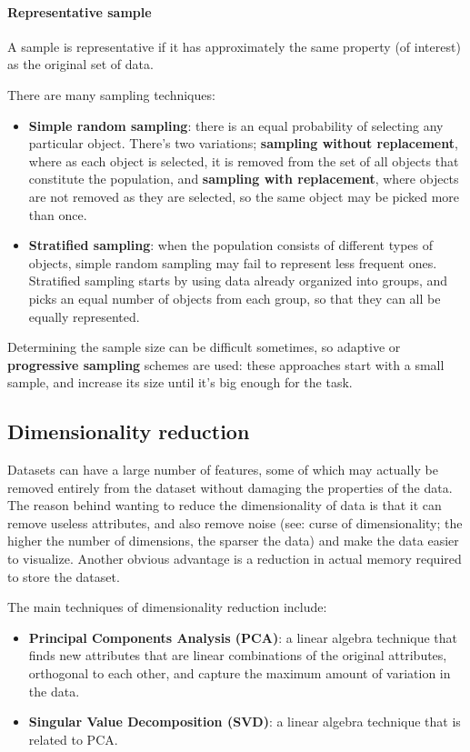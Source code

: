 \paragraph{Representative sample} A sample is representative if it has approximately the same property (of interest) as the original set of data.

There are many sampling techniques:

\begin{itemize}
    \item \textbf{Simple random sampling}: there is an equal probability of selecting any particular object. There's two variations; \textbf{sampling without replacement}, where as each object is selected, it is removed from the set of all objects that constitute the population, and \textbf{sampling with replacement}, where objects are not removed as they are selected, so the same object may be picked more than once.

    \item \textbf{Stratified sampling}: when the population consists of different types of objects, simple random sampling may fail to represent less frequent ones. Stratified sampling starts by using data already organized into groups, and picks an equal number of objects from each group, so that they can all be equally represented.
\end{itemize}

Determining the sample size can be difficult sometimes, so adaptive or \textbf{progressive sampling} schemes are used: these approaches start with a small sample, and increase its size until it's big enough for the task.

\subsection{Dimensionality reduction}

Datasets can have a large number of features, some of which may actually be removed entirely from the dataset without damaging the properties of the data. The reason behind wanting to reduce the dimensionality of data is that it can remove useless attributes, and also remove noise (see: curse of dimensionality; the higher the number of dimensions, the sparser the data) and make the data easier to visualize. Another obvious advantage is a reduction in actual memory required to store the dataset.

The main techniques of dimensionality reduction include:

\begin{itemize}
    \item \textbf{Principal Components Analysis (PCA)}: a linear algebra technique that finds new attributes that are linear combinations of the original attributes, orthogonal to each other, and capture the maximum amount of variation in the data.

    \item \textbf{Singular Value Decomposition (SVD)}: a linear algebra technique that is related to PCA.
\end{itemize}

